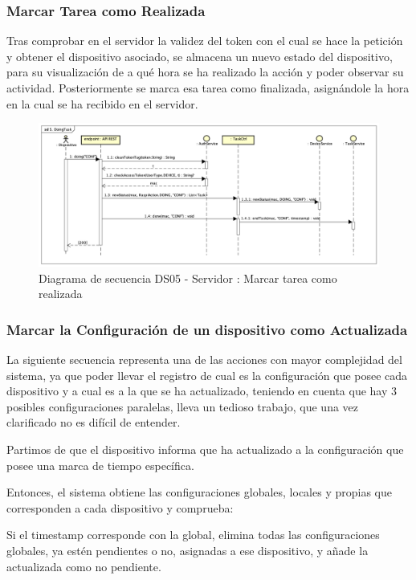 \subsubsection{Marcar Tarea como Realizada}

Tras comprobar en el servidor la validez del token con el cual se hace la petición y obtener el dispositivo asociado, se almacena un nuevo estado del dispositivo, para su visualización de a qué hora se ha realizado la acción y poder observar su actividad. Posteriormente se marca esa tarea como finalizada, asignándole la hora en la cual se ha recibido en el servidor.

\begin{figure}[H]
    \centering
    \includegraphics[width=14cm]{./img/sequence/diagram/doingTask.png}
    \caption{Diagrama de secuencia DS05 - Servidor : Marcar tarea como realizada}
    \label{fig:seq.doing}
\end{figure}


\subsubsection{Marcar la Configuración de un dispositivo como Actualizada}

La siguiente secuencia representa una de las acciones con mayor complejidad del sistema, ya que poder llevar el registro de cual es la configuración que posee cada dispositivo y a cual es a la que se ha actualizado, teniendo en cuenta que hay 3 posibles configuraciones paralelas, lleva un tedioso trabajo, que una vez clarificado no es difícil de entender.

Partimos de que el dispositivo informa que ha actualizado a la configuración que posee una marca de tiempo específica.

Entonces, el sistema obtiene las configuraciones globales, locales y propias que corresponden a cada dispositivo y comprueba:

Si el timestamp corresponde con la global, elimina todas las configuraciones globales, ya estén pendientes o no, asignadas a ese dispositivo, y añade la actualizada como no pendiente.

